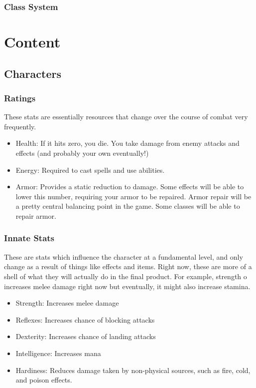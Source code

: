 \documentclass{article}
\begin{document}
\subsubsection{Class System}

\section{Content}
\subsection{Characters}
\subsubsection{Ratings}
These stats are essentially resources that change over the course of combat very frequently.
\begin{itemize}
    \item Health: If it hits zero, you die. You take damage from enemy attacks and effects (and probably
        your own eventually!)
    \item Energy: Required to cast spells and use abilities.
    \item Armor: Provides a static reduction to damage. Some effects will be able to lower this number,
        requiring your armor to be repaired. Armor repair
        will be a pretty central balancing point in the game. Some classes will be able to repair armor.
\end{itemize}

\subsubsection{Innate Stats}
These are stats which influence the character at a fundamental level, and only change as a result of things
like effects and items. Right now, these are more of a shell of what they will actually do in the final
product. For example, strength o increases melee damage right now but eventually, it might also increase stamina.
\begin{itemize}
    \item Strength: Increases melee damage
    \item Reflexes: Increases chance of blocking attacks
    \item Dexterity: Increases chance of landing attacks
    \item Intelligence: Increases mana
    \item Hardiness: Reduces damage taken by non-physical sources, such as fire, cold, and poison effects.
\end{itemize}
\end{document}
